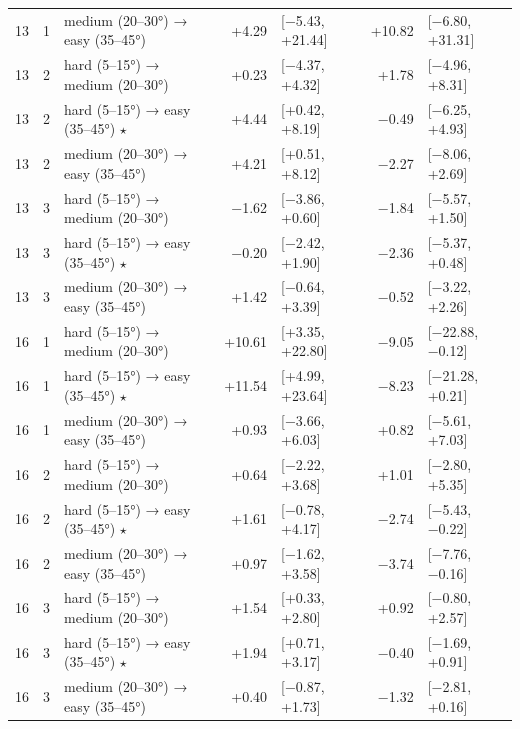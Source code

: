 \begin{table}[htbp]
\begin{tabular}{rllrlrl}
    13 & 1 & medium (20–30°) → easy (35–45°) & +4.29 & [−5.43, +21.44] & +10.82 & [−6.80, +31.31] \\
    13 & 2 & hard (5–15°) → medium (20–30°) & +0.23 & [−4.37, +4.32] & +1.78 & [−4.96, +8.31] \\
    13 & 2 & hard (5–15°) → easy (35–45°) $\star$ & +4.44 & [+0.42, +8.19] & −0.49 & [−6.25, +4.93] \\
    13 & 2 & medium (20–30°) → easy (35–45°) & +4.21 & [+0.51, +8.12] & −2.27 & [−8.06, +2.69] \\
    13 & 3 & hard (5–15°) → medium (20–30°) & −1.62 & [−3.86, +0.60] & −1.84 & [−5.57, +1.50] \\
    13 & 3 & hard (5–15°) → easy (35–45°) $\star$ & −0.20 & [−2.42, +1.90] & −2.36 & [−5.37, +0.48] \\
    13 & 3 & medium (20–30°) → easy (35–45°) & +1.42 & [−0.64, +3.39] & −0.52 & [−3.22, +2.26] \\
    16 & 1 & hard (5–15°) → medium (20–30°) & +10.61 & [+3.35, +22.80] & −9.05 & [−22.88, −0.12] \\
    16 & 1 & hard (5–15°) → easy (35–45°) $\star$ & +11.54 & [+4.99, +23.64] & −8.23 & [−21.28, +0.21] \\
    16 & 1 & medium (20–30°) → easy (35–45°) & +0.93 & [−3.66, +6.03] & +0.82 & [−5.61, +7.03] \\
    16 & 2 & hard (5–15°) → medium (20–30°) & +0.64 & [−2.22, +3.68] & +1.01 & [−2.80, +5.35] \\
    16 & 2 & hard (5–15°) → easy (35–45°) $\star$ & +1.61 & [−0.78, +4.17] & −2.74 & [−5.43, −0.22] \\
    16 & 2 & medium (20–30°) → easy (35–45°) & +0.97 & [−1.62, +3.58] & −3.74 & [−7.76, −0.16] \\
    16 & 3 & hard (5–15°) → medium (20–30°) & +1.54 & [+0.33, +2.80] & +0.92 & [−0.80, +2.57] \\
    16 & 3 & hard (5–15°) → easy (35–45°) $\star$ & +1.94 & [+0.71, +3.17] & −0.40 & [−1.69, +0.91] \\
    16 & 3 & medium (20–30°) → easy (35–45°) & +0.40 & [−0.87, +1.73] & −1.32 & [−2.81, +0.16] \\
    \bottomrule
  \end{tabular}
\end{table}
